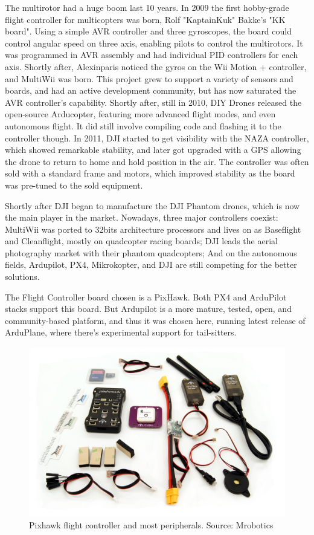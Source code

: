 The multirotor had a huge boom last 10 years. In 2009 the first hobby-grade flight controller for multicopters was born, Rolf "KaptainKuk" Bakke's "KK board". Using a simple AVR controller and three gyroscopes, the board could control angular speed on three axis, enabling pilots to control the multirotors. It was programmed in AVR assembly and had individual PID controllers for each axis.
%
Shortly after, Alexinparis noticed the gyros on the Wii Motion + controller, and MultiWii was born. This project grew to support a variety of sensors and boards, and had an active development community, but has now saturated the AVR controller's capability.
%
Shortly after, still in 2010, DIY Drones released the open-source Arducopter, featuring more advanced flight modes, and even autonomous flight.  It did still involve compiling code and flashing it to the controller though.
%
In 2011, DJI started to get visibility with the NAZA controller, which showed remarkable stability, and later got upgraded with a GPS allowing the drone to return to home and hold position in the air. The controller was often sold with a standard frame and motors, which improved stability as the board was pre-tuned to the sold equipment.

Shortly after DJI began to manufacture the DJI Phantom drones, which is now the main player in the market.
%
Nowadays, three major controllers coexist: MultiWii was ported to 32bits architecture processors and lives on as Baseflight and Cleanflight, mostly on quadcopter racing boards; DJI leads the aerial photography market with their phantom quadcopters; And on the autonomous fields, Ardupilot, PX4, Mikrokopter, and DJI are still competing for the better solutions.


The Flight Controller board chosen is a PixHawk. Both PX4 and ArduPilot stacks support this board. But Ardupilot is a more mature, tested, open, and community-based platform, and thus it was chosen here, running latest release of ArduPlane, where there's experimental support for tail-sitters.

\begin{figure}[H]
\centering
  \includegraphics[width=0.8\linewidth]{figs/pixhawk.jpg}
  \caption{Pixhawk flight controller and most peripherals. Source: Mrobotics}
  \label{fig:pixhawk}
\end{figure}

